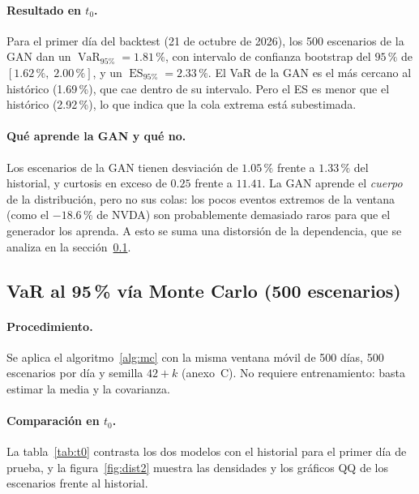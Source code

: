 \documentclass[12pt,letterpaper]{article}
\newcommand{\VaR}{\operatorname{VaR}}
\newcommand{\ES}{\operatorname{ES}}
\begin{document}
\paragraph{Resultado en $t_0$.}
Para el primer día del backtest (21 de octubre de 2026), los 500 escenarios de la GAN dan un $\VaR_{95\%}=1.81\,\%$, con intervalo de confianza bootstrap del $95\,\%$ de $[1.62\,\%,\;2.00\,\%]$, y un $\ES_{95\%}=2.33\,\%$. El VaR de la GAN es el más cercano al histórico (1.69\,\%), que cae dentro de su intervalo. Pero el ES es menor que el histórico (2.92\,\%), lo que indica que la cola extrema está subestimada.

\paragraph{Qué aprende la GAN y qué no.}
Los escenarios de la GAN tienen desviación de $1.05\,\%$ frente a $1.33\,\%$ del historial, y curtosis en exceso de $0.25$ frente a $11.41$. La GAN aprende el \emph{cuerpo} de la distribución, pero no sus colas: los pocos eventos extremos de la ventana (como el $-18.6\,\%$ de NVDA) son probablemente demasiado raros para que el generador los aprenda. A esto se suma una distorsión de la dependencia, que se analiza en la sección~\ref{sec:mc}.

\subsection{VaR al 95\,\% vía Monte Carlo (500 escenarios)}\label{sec:mc}

\paragraph{Procedimiento.}
Se aplica el algoritmo~\ref{alg:mc} con la misma ventana móvil de 500 días, 500 escenarios por día y semilla $42+k$ (anexo~C). No requiere entrenamiento: basta estimar la media y la covarianza.

\paragraph{Comparación en $t_0$.}
La tabla~\ref{tab:t0} contrasta los dos modelos con el historial para el primer día de prueba, y la figura~\ref{fig:dist2} muestra las densidades y los gráficos QQ de los escenarios frente al historial.
\end{document}
